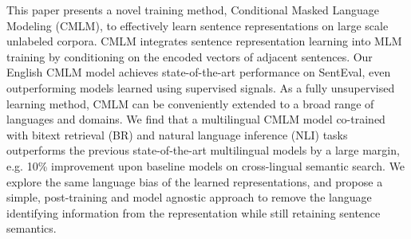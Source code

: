 This paper presents a novel training method, Conditional Masked Language Modeling (CMLM), to effectively learn sentence representations on large scale unlabeled corpora. CMLM integrates sentence representation learning into MLM training by conditioning on the encoded vectors of adjacent sentences. Our English CMLM model achieves state-of-the-art performance on SentEval, even outperforming models learned using supervised signals. As a fully unsupervised learning method, CMLM can be conveniently extended to a broad range of languages and domains. We find that a multilingual CMLM model co-trained with bitext retrieval (BR) and natural language inference (NLI) tasks outperforms the previous state-of-the-art multilingual models by a large margin, e.g. 10\% improvement upon baseline models on cross-lingual semantic search. We explore the same language bias of the learned representations, and propose a simple, post-training and model agnostic approach to remove the language identifying information from the representation while still retaining sentence semantics.
